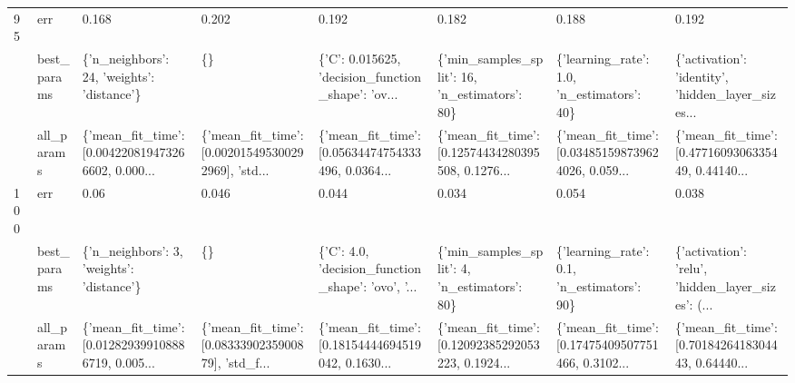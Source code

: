 \begin{tabular}{llllllll}
95  & err &                                              0.168 &                                              0.202 &                                              0.192 &                                              0.182 &                                              0.188 &                                              0.192 \\
    & best\_params &         \{'n\_neighbors': 24, 'weights': 'distance'\} &                                                 \{\} &  \{'C': 0.015625, 'decision\_function\_shape': 'ov... &      \{'min\_samples\_split': 16, 'n\_estimators': 80\} &         \{'learning\_rate': 1.0, 'n\_estimators': 40\} &  \{'activation': 'identity', 'hidden\_layer\_sizes... \\
    & all\_params &  \{'mean\_fit\_time': [0.004220819473266602, 0.000... &  \{'mean\_fit\_time': [0.002015495300292969], 'std... &  \{'mean\_fit\_time': [0.05634474754333496, 0.0364... &  \{'mean\_fit\_time': [0.12574434280395508, 0.1276... &  \{'mean\_fit\_time': [0.034851598739624026, 0.059... &  \{'mean\_fit\_time': [0.4771609306335449, 0.44140... \\
100 & err &                                               0.06 &                                              0.046 &                                              0.044 &                                              0.034 &                                              0.054 &                                              0.038 \\
    & best\_params &          \{'n\_neighbors': 3, 'weights': 'distance'\} &                                                 \{\} &  \{'C': 4.0, 'decision\_function\_shape': 'ovo', '... &       \{'min\_samples\_split': 4, 'n\_estimators': 80\} &         \{'learning\_rate': 0.1, 'n\_estimators': 90\} &  \{'activation': 'relu', 'hidden\_layer\_sizes': (... \\
    & all\_params &  \{'mean\_fit\_time': [0.012829399108886719, 0.005... &  \{'mean\_fit\_time': [0.0833390235900879], 'std\_f... &  \{'mean\_fit\_time': [0.18154444694519042, 0.1630... &  \{'mean\_fit\_time': [0.12092385292053223, 0.1924... &  \{'mean\_fit\_time': [0.17475409507751466, 0.3102... &  \{'mean\_fit\_time': [0.7018426418304443, 0.64440... \\
\bottomrule
\end{tabular}
